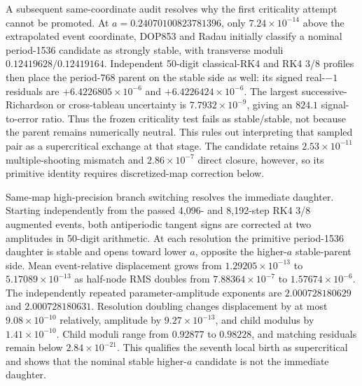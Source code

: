 A subsequent same-coordinate audit resolves why the first criticality attempt
cannot be promoted. At $a=0.24070100823781396$, only
$7.24\times10^{-14}$ above the extrapolated event coordinate, DOP853 and Radau
initially classify a nominal period-1536 candidate as strongly stable,
with transverse moduli $0.12419628/0.12419164$. Independent 50-digit
classical-RK4 and RK4 3/8 profiles then place the period-768 parent on the
stable side as well: its signed real-$-1$ residuals are
$+6.4226805\times10^{-6}$ and $+6.4226424\times10^{-6}$. The largest
successive-Richardson or cross-tableau uncertainty is
$7.7932\times10^{-9}$, giving an $824.1$ signal-to-error ratio. Thus the
frozen criticality test fails as stable/stable, not because the parent remains
numerically neutral. This rules out interpreting that sampled pair as a
supercritical exchange at that stage. The candidate retains
$2.53\times10^{-11}$ multiple-shooting mismatch and $2.86\times10^{-7}$ direct
closure, however, so its primitive identity requires discretized-map correction
below.

Same-map high-precision branch switching resolves the immediate daughter.
Starting independently from the passed 4,096- and 8,192-step RK4 3/8 augmented
events, both antiperiodic tangent signs are corrected at two amplitudes in
50-digit arithmetic. At each resolution the primitive period-1536 daughter is
stable and opens toward lower $a$, opposite the higher-$a$ stable-parent side.
Mean event-relative displacement grows from $1.29205\times10^{-13}$ to
$5.17089\times10^{-13}$ as half-node RMS doubles from
$7.88364\times10^{-7}$ to $1.57674\times10^{-6}$. The independently repeated
parameter-amplitude exponents are $2.000728180629$ and $2.000728180631$.
Resolution doubling changes displacement by at most $9.08\times10^{-10}$
relatively, amplitude by $9.27\times10^{-13}$, and child modulus by
$1.41\times10^{-10}$. Child moduli range from $0.92877$ to $0.98228$, and
matching residuals remain below $2.84\times10^{-21}$. This qualifies the
seventh local birth as supercritical and shows that the nominal stable
higher-$a$ candidate is not the immediate daughter.

